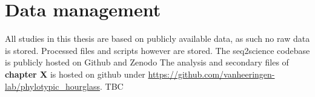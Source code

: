 \section{Data management}

All studies in this thesis are based on publicly available data, as such no raw data is stored. Processed files and scripts however are stored. The seq2science codebase is publicly hosted on Github and Zenodo The analysis and secondary files of \textbf{chapter X} is hosted on github under \url{https://github.com/vanheeringen-lab/phylotypic_hourglass}. TBC